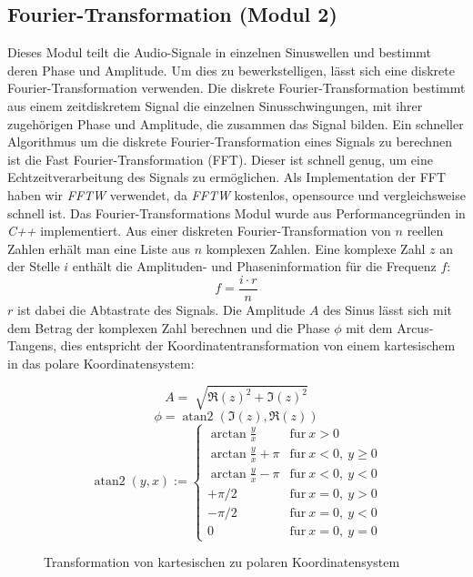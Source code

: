 \subsection{Fourier-Transformation (Modul 2)}
Dieses Modul teilt die Audio-Signale in einzelnen Sinuswellen und bestimmt deren Phase und Amplitude. Um dies zu bewerkstelligen, lässt sich eine diskrete Fourier-Transformation verwenden. Die diskrete Fourier-Transformation bestimmt aus einem zeitdiskretem Signal die einzelnen Sinusschwingungen, mit ihrer zugehörigen Phase und Amplitude, die zusammen das Signal bilden. Ein schneller Algorithmus um die diskrete Fourier-Transformation eines Signals zu berechnen ist die Fast Fourier-Transformation (FFT). Dieser ist schnell genug, um eine Echtzeitverarbeitung des Signals zu ermöglichen. Als Implementation der FFT haben wir \textit{FFTW}\cite{FFTW} verwendet, da \textit{FFTW} kostenlos, opensource und vergleichsweise schnell ist.
Das Fourier-Transformations Modul wurde aus Performancegründen in \textit{C++} implementiert.
Aus einer diskreten Fourier-Transformation von $n$ reellen Zahlen erhält man eine Liste aus $n$ komplexen Zahlen. Eine komplexe Zahl $z$ an der Stelle $i$ enthält die Amplituden- und Phaseninformation für die Frequenz $f$:
$$
f = \frac{i\cdot r}{n}
$$
$r$ ist dabei die Abtastrate des Signals. Die Amplitude $A$ des Sinus lässt sich mit dem Betrag der komplexen Zahl berechnen und die Phase $\phi$ mit dem Arcus-Tangens, dies entspricht der Koordinatentransformation von einem kartesischem in das polare Koordinatensystem:\\
\begin{minipage}{0.49\textwidth}
	\vspace{-40pt}
  $$
  A = \sqrt[]{{\Re(z)}^2 + {\Im(z)}^2}
  $$
  $$
  \phi = \operatorname{atan2}(\Im(z), \Re(z))
  $$
  $$
  \operatorname{atan2}(y,x) := \begin{cases} \arctan\frac{y}{x} & \mathrm{f\ddot ur}\ x > 0\\ \arctan\frac{y}{x} + \pi & \mathrm{f\ddot ur}\ x < 0,\ y \geq 0\\ \arctan\frac{y}{x} - \pi & \mathrm{f\ddot ur}\ x < 0,\ y < 0\\ +\pi/2 & \mathrm{f\ddot ur}\ x = 0,\ y > 0\\ -\pi/2 & \mathrm{f\ddot ur}\ x = 0,\ y < 0\\ 0 & \mathrm{f\ddot ur}\ x = 0,\ y = 0 \end{cases}
  $$
\end{minipage}
\begin{minipage}{0.49\textwidth}
  \begin{figure}[H]
    \centering
    \scalebox{.7}{}
    \caption{Transformation von kartesischen zu polaren Koordinatensystem}
    \label{fig:polarconvert}
  \end{figure}
\end{minipage}
